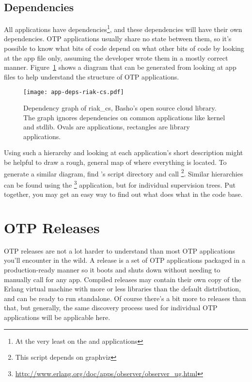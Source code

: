 \subsection{Dependencies}
\label{subsec:dive-dependencies}

All applications have dependencies\footnote{At the very least on the  and  applications}, and these dependencies will have their own dependencies. OTP applications usually share no state between them, so it's possible to know what bits of code depend on what other bits of code by looking at the app file only, assuming the developer wrote them in a mostly correct manner. Figure~\ref{fig:app-deps} shows a diagram that can be generated from looking at app files to help understand the structure of OTP applications.


\begin{figure}
  \texttt{[image: app-deps-riak-cs.pdf]}%
  \caption{Dependency graph of riak\_cs, Basho's open source cloud library.
  The graph ignores dependencies on common applications like kernel and stdlib. Ovals are applications, rectangles are library applications.}%
   \label{fig:app-deps}
\end{figure}

Using such a hierarchy and looking at each application's short description might be helpful to draw a rough, general map of where everything is located. To generate a similar diagram, find 's script directory and call \footnote{This script depends on graphviz}. Similar hierarchies can be found using the \footnote{\href{http://www.erlang.org/doc/apps/observer/observer\_ug.html}{http://www.erlang.org/doc/apps/observer/observer\_ug.html}} application, but for individual supervision trees. Put together, you may get an easy way to find out what does what in the code base.

\FloatBarrier

\section{OTP Releases}
\label{sec:dive-otp-releases}

OTP releases are not a lot harder to understand than most OTP applications you'll encounter in the wild. A release is a set of OTP applications packaged in a production-ready manner so it boots and shuts down without needing to manually call  for any app. Compiled releases may contain their own copy of the Erlang virtual machine with more or less libraries than the default distribution, and can be ready to run standalone. Of course there's a bit more to releases than that, but generally, the same discovery process used for individual OTP applications will be applicable here.

